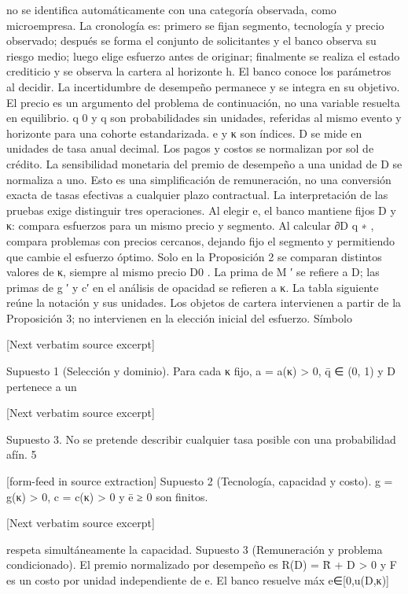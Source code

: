 \documentclass[10pt]{article}
\begin{document}
\begin{ReviewVerbatim}
no se identiﬁca automáticamente con una categoría observada, como microempresa.
La cronología es: primero se ﬁjan segmento, tecnología y precio observado; después se forma el
conjunto de solicitantes y el banco observa su riesgo medio; luego elige esfuerzo antes de originar;
ﬁnalmente se realiza el estado crediticio y se observa la cartera al horizonte h. El banco conoce los
parámetros al decidir. La incertidumbre de desempeño permanece y se integra en su objetivo. El
precio es un argumento del problema de continuación, no una variable resuelta en equilibrio.
q 0 y q son probabilidades sin unidades, referidas al mismo evento y horizonte para una cohorte
estandarizada. e y κ son índices. D se mide en unidades de tasa anual decimal. Los pagos y costos
se normalizan por sol de crédito. La sensibilidad monetaria del premio de desempeño a una unidad
de D se normaliza a uno. Esto es una simpliﬁcación de remuneración, no una conversión exacta de
tasas efectivas a cualquier plazo contractual.
La interpretación de las pruebas exige distinguir tres operaciones. Al elegir e, el banco mantiene
ﬁjos D y κ: compara esfuerzos para un mismo precio y segmento. Al calcular ∂D q ∗ , compara
problemas con precios cercanos, dejando ﬁjo el segmento y permitiendo que cambie el esfuerzo
óptimo. Solo en la Proposición 2 se comparan distintos valores de κ, siempre al mismo precio D0 .
La prima de M ′ se reﬁere a D; las primas de g ′ y c′ en el análisis de opacidad se reﬁeren a κ.
La tabla siguiente reúne la notación y sus unidades. Los objetos de cartera intervienen a partir
de la Proposición 3; no intervienen en la elección inicial del esfuerzo.
Símbolo

[Next verbatim source excerpt]


Supuesto 1 (Selección y dominio). Para cada κ ﬁjo, a = a(κ) > 0, q̄ ∈ (0, 1) y D pertenece a un

[Next verbatim source excerpt]

Supuesto 3. No se pretende describir cualquier tasa posible con una probabilidad afín.
5


[form-feed in source extraction]
Supuesto 2 (Tecnología, capacidad y costo). g = g(κ) > 0, c = c(κ) > 0 y ē ≥ 0 son ﬁnitos.

[Next verbatim source excerpt]

respeta simultáneamente la capacidad.
Supuesto 3 (Remuneración y problema condicionado). El premio normalizado por desempeño es
R(D) = R̄ + D > 0 y F es un costo por unidad independiente de e. El banco resuelve
máx
e∈[0,u(D,κ)]


\end{ReviewVerbatim}
\end{document}
